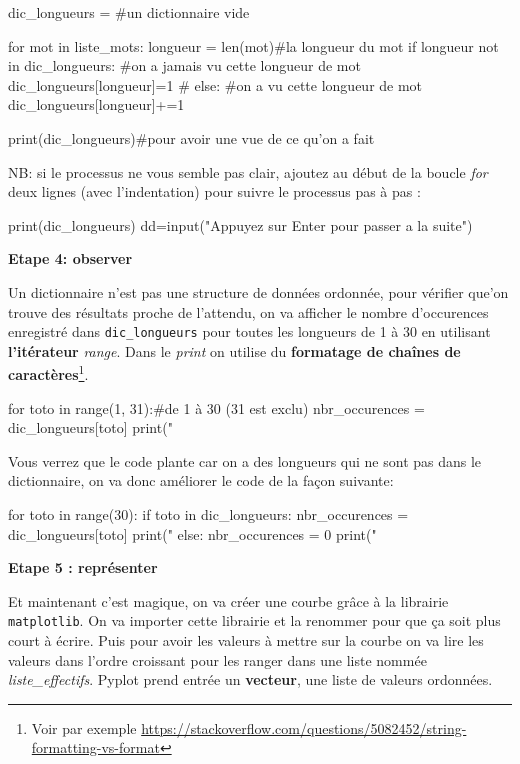 \begin{python}
dic_longueurs = {} #un dictionnaire vide

for mot in liste_mots:
  longueur = len(mot)#la longueur du mot
  if longueur not in dic_longueurs: #on a jamais vu cette longueur de mot
    dic_longueurs[longueur]=1 #
  else: #on a vu cette longueur de mot
    dic_longueurs[longueur]+=1

print(dic_longueurs)#pour avoir une vue de ce qu'on a fait

\end{python}

NB: si le processus ne vous semble pas clair, ajoutez au début de la boucle \textit{for} deux lignes (avec l'indentation) pour suivre le processus pas à pas :

\begin{python}
  print(dic_longueurs)
  dd=input("Appuyez sur Enter pour passer a la suite")
\end{python}

\textbf{Etape 4: observer}

Un dictionnaire n'est pas une structure de données ordonnée, pour vérifier que'on trouve des résultats proche de l'attendu, on va afficher le nombre d'occurences enregistré dans \texttt{dic\_longueurs} pour toutes les longueurs de 1 à 30 en utilisant \textbf{l'itérateur} \textit{range}. Dans le \textit{print} on utilise du \textbf{formatage de chaînes de caractères}\footnote{Voir par exemple \url{https://stackoverflow.com/questions/5082452/string-formatting-vs-format}}.

\begin{python}
for toto in range(1, 31):#de 1 à 30 (31 est exclu)
  nbr_occurences = dic_longueurs[toto]
  print("%
\end{python}

Vous verrez que le code plante car on a des longueurs qui ne sont pas dans le dictionnaire, on va donc améliorer le code de la façon suivante:

\begin{python}
for toto in range(30):
  if toto in dic_longueurs:
    nbr_occurences = dic_longueurs[toto]
    print("%
  else:
    nbr_occurences = 0 
    print("%
\end{python}


\textbf{Etape 5 : représenter}

Et maintenant c'est magique, on va créer une courbe grâce à la librairie \texttt{matplotlib}. On va importer cette librairie et la renommer pour que ça soit plus court à écrire. Puis pour avoir les valeurs à mettre sur la courbe on va lire les valeurs dans l'ordre croissant pour les ranger dans une liste nommée \textit{liste\_effectifs}. Pyplot prend entrée un \textbf{vecteur}, une liste de valeurs ordonnées.

